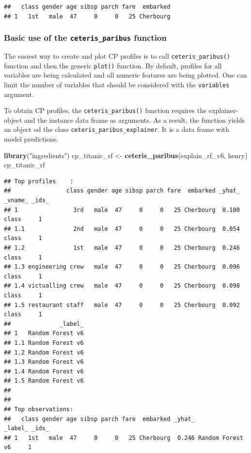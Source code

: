 \documentclass[12pt,]{krantz}
\newenvironment{Shaded}{\begin{snugshade}}{\end{snugshade}}
\newcommand{\KeywordTok}[1]{\textcolor[rgb]{0.13,0.29,0.53}{\textbf{#1}}}
\newcommand{\NormalTok}[1]{#1}
\newcommand{\StringTok}[1]{\textcolor[rgb]{0.31,0.60,0.02}{#1}}
\begin{document}
\begin{verbatim}
##   class gender age sibsp parch fare  embarked
## 1   1st   male  47     0     0   25 Cherbourg
\end{verbatim}

\hypertarget{basic-use-of-the-ceteris_paribus-function}{%
\subsubsection{\texorpdfstring{Basic use of the \texttt{ceteris\_paribus} function}{Basic use of the ceteris\_paribus function}}\label{basic-use-of-the-ceteris_paribus-function}}

The easiest way to create and plot CP profiles is to call \texttt{ceteris\_paribus()} function and then the generic \texttt{plot()} function. By default, profiles for all variables are being calculated and all numeric features are being plotted. One can limit the number of variables that should be considered with the \texttt{variables} argument.

To obtain CP profiles, the \texttt{ceteris\_paribus()} function requires the explainer-object and the instance data frame as arguments. As a result, the function yields an object od the class \texttt{ceteris\_paribus\_explainer}. It is a data frame with model predictions.

\begin{Shaded}
\begin{Highlighting}[]
\KeywordTok{library}\NormalTok{(}\StringTok{"ingredients"}\NormalTok{)}
\NormalTok{cp_titanic_rf <-}\StringTok{ }\KeywordTok{ceteris_paribus}\NormalTok{(explain_rf_v6, henry)}
\NormalTok{cp_titanic_rf}
\end{Highlighting}
\end{Shaded}

\begin{verbatim}
## Top profiles    : 
##                class gender age sibsp parch fare  embarked _yhat_ _vname_ _ids_
## 1                3rd   male  47     0     0   25 Cherbourg  0.100   class     1
## 1.1              2nd   male  47     0     0   25 Cherbourg  0.054   class     1
## 1.2              1st   male  47     0     0   25 Cherbourg  0.246   class     1
## 1.3 engineering crew   male  47     0     0   25 Cherbourg  0.096   class     1
## 1.4 victualling crew   male  47     0     0   25 Cherbourg  0.098   class     1
## 1.5 restaurant staff   male  47     0     0   25 Cherbourg  0.092   class     1
##              _label_
## 1   Random Forest v6
## 1.1 Random Forest v6
## 1.2 Random Forest v6
## 1.3 Random Forest v6
## 1.4 Random Forest v6
## 1.5 Random Forest v6
## 
## 
## Top observations:
##   class gender age sibsp parch fare  embarked _yhat_          _label_ _ids_
## 1   1st   male  47     0     0   25 Cherbourg  0.246 Random Forest v6     1
\end{verbatim}
\end{document}
